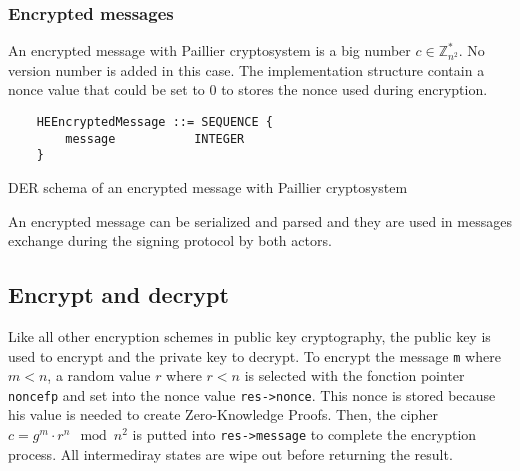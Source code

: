 \subsubsection{Encrypted messages}

An encrypted message with Paillier cryptosystem is a big number $c \in \mathbb{Z}_{n^2}^*$.
No version number is added in this case.
The implementation structure contain a nonce value that could be set to 0
to stores the nonce used during encryption.

\begin{listing}
  \begin{verbatim}
    HEEncryptedMessage ::= SEQUENCE {
        message           INTEGER
    }
  \end{verbatim}
	\caption{DER schema of an encrypted message with Paillier cryptosystem}
	\label{lst:DERSchemaPaillierEncMessage}
\end{listing}

An encrypted message can be serialized and parsed and they are used in
messages exchange during the signing protocol by both actors.

%

\subsection{Encrypt and decrypt}

Like all other encryption schemes in public key cryptography, the public key is
used to encrypt and the private key to decrypt.
To encrypt the message \texttt{m} where $m < n$, a random value $r$ where
$r < n$ is selected with the fonction pointer \texttt{noncefp} and set into
the nonce value \texttt{res->nonce}. This nonce is stored because his value is
needed to create Zero-Knowledge Proofs. Then, the cipher $c = g^m \cdot r^n \mod n^2$
is putted into \texttt{res->message} to complete the encryption process. All intermediray
states are wipe out before returning the result.

